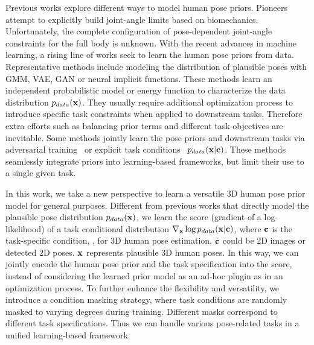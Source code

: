 \documentclass[10pt,twocolumn,letterpaper]{article}
\begin{document}
Previous works explore different ways to model human pose priors. Pioneers~\cite{hatze1997three, kodek2002identifying} attempt to explicitly build joint-angle limits based on biomechanics. Unfortunately, the complete configuration of pose-dependent joint-angle constraints for the full body is unknown. 
With the recent advances in machine learning, a rising line of works seek to learn the human pose priors from data. Representative methods include modeling the distribution of plausible poses with GMM\cite{bogo2016keep}, VAE\cite{pavlakos2019expressive}, GAN\cite{davydov2022adversarial} or neural implicit functions\cite{tiwari2022pose}.
These methods learn an independent probabilistic model or energy function to characterize the data distribution $p_{data}(\mathbf{x})$. They usually require additional optimization process to introduce specific task constraints when applied to downstream tasks. Therefore extra efforts such as balancing prior terms and different task objectives are inevitable. Some methods jointly learn the pose priors and downstream tasks via adversarial training~\cite{hmrKanazawa17, kocabas2019vibe} or explicit task conditions~\cite{ling2020character, rempe2021humor, petrovich21actor} $p_{data}(\mathbf{x} | \mathbf{c})$. These methods seamlessly integrate priors into learning-based frameworks, but limit their use to a single given task.

In this work, we take a new perspective to learn a versatile 3D human pose prior model for general purposes. 
Different from previous works that directly model the plausible pose distribution $p_{data}(\mathbf{x})$, we learn the score (gradient of a log-likelihood) of a task conditional distribution $\nabla_{\mathbf{x}}\log p_{data}(\mathbf{x} | \mathbf{c} )$, where $\mathbf{c}$ is the task-specific condition, \eg, for 3D human pose estimation, $\mathbf{c}$ could be 2D images or detected 2D poses. $\mathbf{x}$ represents plausible 3D human poses. 
In this way, we can jointly encode the human pose prior and the task specification into the score, instead of considering the learned prior model as an ad-hoc plugin as in an optimization process. 
To further enhance the flexibility and versatility, we introduce a condition masking strategy, where task conditions are randomly masked to varying degrees during training. Different masks correspond to different task specifications. Thus we can handle various pose-related tasks in a unified learning-based framework.
\end{document}

